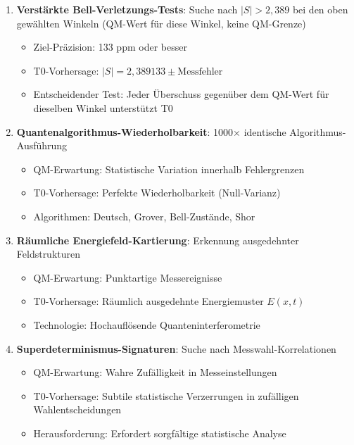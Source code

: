 \begin{enumerate}
	\item \textbf{Verstärkte Bell-Verletzungs-Tests}: Suche nach $|S| > 2,389$ bei den oben gewählten Winkeln (QM-Wert für diese Winkel, keine QM-Grenze)
	\begin{itemize}
		\item Ziel-Präzision: 133 ppm oder besser
		\item T0-Vorhersage: $|S| = 2,389133 \pm \text{Messfehler}$
		\item Entscheidender Test: Jeder Überschuss gegenüber dem QM-Wert für dieselben Winkel unterstützt T0
	\end{itemize}
	
	\item \textbf{Quantenalgorithmus-Wiederholbarkeit}: 1000$\times$ identische Algorithmus-Ausführung
	\begin{itemize}
		\item QM-Erwartung: Statistische Variation innerhalb Fehlergrenzen
		\item T0-Vorhersage: Perfekte Wiederholbarkeit (Null-Varianz)
		\item Algorithmen: Deutsch, Grover, Bell-Zustände, Shor
	\end{itemize}
	
	\item \textbf{Räumliche Energiefeld-Kartierung}: Erkennung ausgedehnter Feldstrukturen
	\begin{itemize}
		\item QM-Erwartung: Punktartige Messereignisse
		\item T0-Vorhersage: Räumlich ausgedehnte Energiemuster $E(x,t)$
		\item Technologie: Hochauflösende Quanteninterferometrie
	\end{itemize}
	
	\item \textbf{Superdeterminismus-Signaturen}: Suche nach Messwahl-Korrelationen
	\begin{itemize}
		\item QM-Erwartung: Wahre Zufälligkeit in Messeinstellungen
		\item T0-Vorhersage: Subtile statistische Verzerrungen in zufälligen Wahlentscheidungen
		\item Herausforderung: Erfordert sorgfältige statistische Analyse
	\end{itemize}
\end{enumerate}
			
